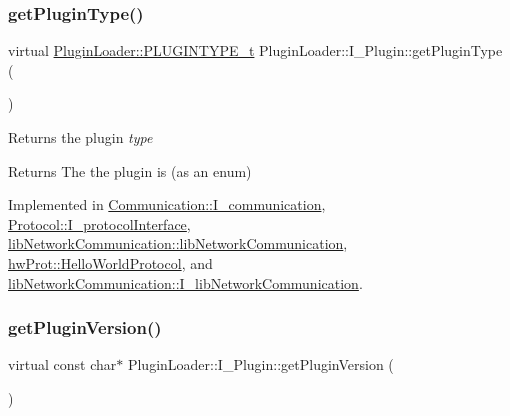 \mbox{\label{classPluginLoader_1_1I__Plugin_aa7d2ca3f7a8551c590a7cbda0f1648f5}} 
\subsubsection{\texorpdfstring{getPluginType()}{getPluginType()}}
{\footnotesize\ttfamily virtual \mbox{\hyperlink{namespacePluginLoader_a7b1358e9577b47b5d4b16231a5a81699}{Plugin\+Loader\+::\+P\+L\+U\+G\+I\+N\+T\+Y\+P\+E\+\_\+t}} Plugin\+Loader\+::\+I\+\_\+\+Plugin\+::get\+Plugin\+Type (\begin{DoxyParamCaption}{ }\end{DoxyParamCaption})\hspace{0.3cm}{\ttfamily [pure virtual]}}



Returns the plugin {\itshape type} 

\begin{DoxyReturn}{Returns}
The the plugin is (as an enum) 
\end{DoxyReturn}


Implemented in \mbox{\hyperlink{classCommunication_1_1I__communication_a531577d9a13f3fcb566a350b74184823}{Communication\+::\+I\+\_\+communication}}, \mbox{\hyperlink{classProtocol_1_1I__protocolInterface_aaa1010c6c48d6a4a99998ae383f2172c}{Protocol\+::\+I\+\_\+protocol\+Interface}}, \mbox{\hyperlink{classlibNetworkCommunication_1_1libNetworkCommunication_a6851c7c48cde1af3d2b6e131fce6b8bc}{lib\+Network\+Communication\+::lib\+Network\+Communication}}, \mbox{\hyperlink{classhwProt_1_1HelloWorldProtocol_aa3a9c97bcf934fa61cd69e19b93a2689}{hw\+Prot\+::\+Hello\+World\+Protocol}}, and \mbox{\hyperlink{classlibNetworkCommunication_1_1I__libNetworkCommunication_a22412ea75e41d612c66c42b3c4dab1f3}{lib\+Network\+Communication\+::\+I\+\_\+lib\+Network\+Communication}}.

\mbox{\label{classPluginLoader_1_1I__Plugin_a43fb739a14ea1cc5ca6a77896a5f7b8f}} 
\subsubsection{\texorpdfstring{getPluginVersion()}{getPluginVersion()}}
{\footnotesize\ttfamily virtual const char$\ast$ Plugin\+Loader\+::\+I\+\_\+\+Plugin\+::get\+Plugin\+Version (\begin{DoxyParamCaption}{ }\end{DoxyParamCaption})\hspace{0.3cm}{\ttfamily [pure virtual]}}



